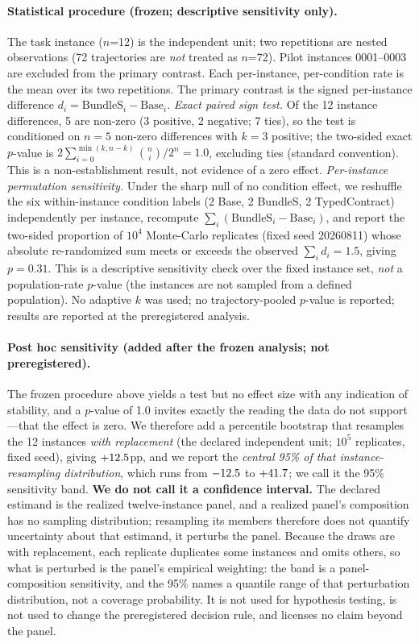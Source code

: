 \documentclass{article}
\begin{document}
\paragraph{Statistical procedure (frozen; descriptive sensitivity only).} The task instance ($n$=12) is the independent unit; two repetitions are nested observations (72 trajectories are \emph{not} treated as $n$=72). Pilot instances 0001--0003 are excluded from the primary contrast. Each per-instance, per-condition rate is the mean over its two repetitions. The primary contrast is the signed per-instance difference $d_i = \mathrm{BundleS}_i - \mathrm{Base}_i$.
\emph{Exact paired sign test.} Of the 12 instance differences, 5 are non-zero (3 positive, 2 negative; 7 ties), so the test is conditioned on $n{=}5$ non-zero differences with $k{=}3$ positive; the two-sided exact $p$-value is $2\sum_{i=0}^{\min(k,n-k)}\binom{n}{i}/2^{n}=1.0$, excluding ties (standard convention). This is a non-establishment result, not evidence of a zero effect.
\emph{Per-instance permutation sensitivity.} Under the sharp null of no condition effect, we reshuffle the six within-instance condition labels (2 Base, 2 BundleS, 2 TypedContract) independently per instance, recompute $\sum_i(\mathrm{BundleS}_i-\mathrm{Base}_i)$, and report the two-sided proportion of $10^{4}$ Monte-Carlo replicates (fixed seed 20260811) whose absolute re-randomized sum meets or exceeds the observed $\sum_i d_i = 1.5$, giving $p=0.31$. This is a descriptive sensitivity check over the fixed instance set, \emph{not} a population-rate $p$-value (the instances are not sampled from a defined population). No adaptive $k$ was used; no trajectory-pooled $p$-value is reported; results are reported at the preregistered analysis.

\paragraph{Post hoc sensitivity (added after the frozen analysis; not preregistered).} The frozen procedure above yields a test but no effect size with any indication of stability, and a $p$-value of 1.0 invites exactly the reading the data do not support---that the effect is zero. We therefore add a percentile bootstrap that resamples the 12 instances \emph{with replacement} (the declared independent unit; $10^{5}$ replicates, fixed seed), giving $+12.5$pp, and we report the \emph{central 95\% of that instance-resampling distribution}, which runs from $-12.5$ to $+41.7$; we call it the 95\% sensitivity band. \textbf{We do not call it a confidence interval.} The declared estimand is the realized twelve-instance panel, and a realized panel's composition has no sampling distribution; resampling its members therefore does not quantify uncertainty about that estimand, it perturbs the panel. Because the draws are with replacement, each replicate duplicates some instances and omits others, so what is perturbed is the panel's empirical weighting: the band is a panel-composition sensitivity, and the 95\% names a quantile range of that perturbation distribution, not a coverage probability. It is not used for hypothesis testing, is not used to change the preregistered decision rule, and licenses no claim beyond the panel.
\end{document}
